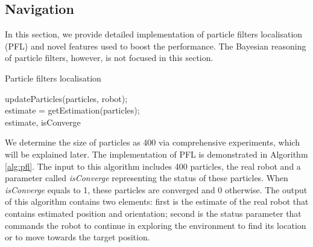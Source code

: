 
\subsection{Navigation}
In this section, we provide detailed implementation of particle filters localisation (PFL) and novel features used to boost the performance. The Bayesian reasoning of particle filters, however, is not focused in this section.

\vspace{1em}
\begin{algorithm}[H]
\caption{Particle filters localisation} \label{alg:pfl}
\SetAlgoLined
  updateParticles(particles, robot); \\
  estimate = getEstimation(particles); \\
  \Return estimate, isConverge
\end{algorithm}
\vspace{1em}

We determine the size of particles as 400 via comprehensive experiments, which will be explained later. The implementation of PFL is demonstrated in Algorithm \ref{alg:pfl}. The input to this algorithm includes 400 particles, the real robot and a parameter called {\itshape isConverge} representing the status of these particles. When {\itshape isConverge} equals to 1, these particles are converged and 0 otherwise. The output of this algorithm contains two elements: first is the estimate of the real robot that contains estimated position and orientation; second is the status parameter that commands the robot to continue in exploring the environment to find its location or to move towards the target position.

